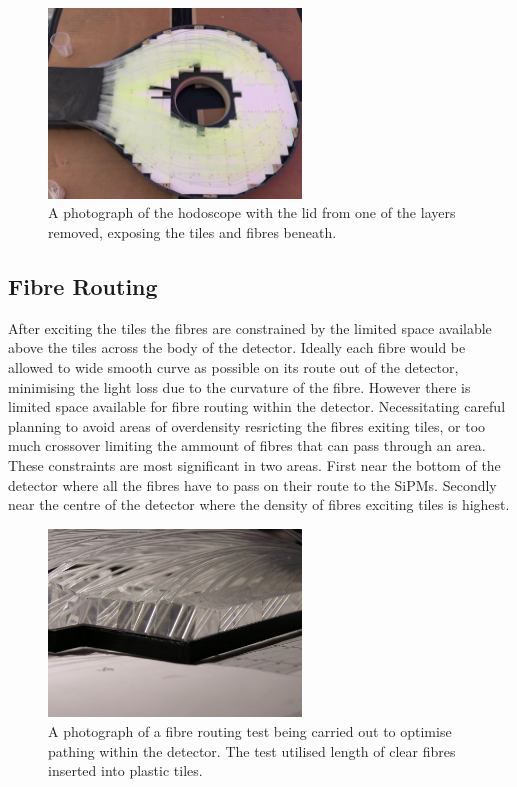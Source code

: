 \begin{figure}
	\centering
	\includegraphics[width=0.6\textwidth]{ImgChap1/hodooverview}
	\caption{A photograph of the hodoscope with the lid from one of the layers removed, exposing the tiles and fibres beneath.}
	\label{hodooverview}
\end{figure}
 
\subsection{Fibre Routing}

After exciting the tiles the fibres are constrained by the limited space available above the tiles across the body of the detector. Ideally each fibre would be allowed to wide smooth curve as possible on its route out of the detector, minimising the light loss due to the curvature of the fibre. However there is limited space available for fibre routing within the detector. Necessitating careful planning to avoid areas of overdensity resricting the fibres exiting tiles, or too much crossover limiting the ammount of fibres that can pass through an area. These constraints are most significant in two areas. First near the bottom of the detector where all the fibres have to pass on their route to the SiPMs. Secondly near the centre of the detector where the density of fibres exciting tiles is highest. 

\begin{figure}
	\centering
	\includegraphics[width=0.6\textwidth]{ImgChap1/fibretest}
	\caption{A photograph of a fibre routing test being carried out to optimise pathing within the detector. The test utilised length of clear fibres inserted into plastic tiles.}
	\label{fibreroutingtest}
\end{figure}

